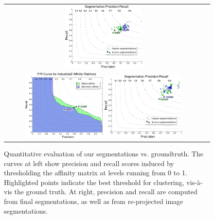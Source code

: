 \begin{figure}
\begin{center}
{{\begin{tabular}{cc}
	      \includegraphics[width=0.4\textwidth]{figs/pipes2/frame_validation.pdf}
	      \\
	      \includegraphics[width=0.4\textwidth]{figs/pipes3/validation.pdf}
	      \includegraphics[width=0.4\textwidth]{figs/pipes3/frame_validation.pdf}
	      \end{tabular}
      }	
   }
\end{center}
{}
\caption{\small Quantitative evaluation of our segmentations vs. groundtruth.
The curves at left show 
precision and recall scores
induced by thresholding the affinity matrix at levels running from 0 to 1.
Highlighted points indicate the best threshold for clustering, vis-\`a-vis the ground truth.
At right, precision
and recall are computed from final segmentations, 
as well as from re-projected image segmentations.}
\label{fig:numericalEval}
{}
\end{figure}

